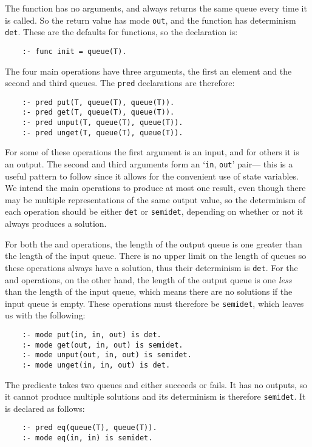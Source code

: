 The  function has no arguments,
and always returns the same queue every time it is called.
So the return value has mode \texttt{out},
and the function has determinism \texttt{det}.
These are the defaults for functions,
so the declaration is:
\begin{verbatim}
    :- func init = queue(T).
\end{verbatim}

The four main operations have three arguments,
the first an element and the second and third queues.
The \texttt{pred} declarations are therefore:
\begin{verbatim}
    :- pred put(T, queue(T), queue(T)).
    :- pred get(T, queue(T), queue(T)).
    :- pred unput(T, queue(T), queue(T)).
    :- pred unget(T, queue(T), queue(T)).
\end{verbatim}
For some of these operations the first argument is an input,
and for others it is an output.
The second and third arguments
form an `\texttt{in}, \texttt{out}' pair---%
this is a useful pattern to follow
since it allows for the convenient use of state variables.
We intend the main operations to produce at most one result,
even though there may be
multiple representations of the same output value,
so the determinism of each operation
should be either \texttt{det} or \texttt{semidet},
depending on whether or not it always produces a solution.

For both the  and  operations,
the length of the output queue is one greater than
the length of the input queue.
There is no upper limit on the length of queues
so these operations always have a solution,
thus their determinism is \texttt{det}.
For the  and  operations,
on the other hand,
the length of the output queue is one \emph{less} than
the length of the input queue,
which means there are no solutions if the input queue is empty.
These operations must therefore be \texttt{semidet},
which leaves us with the following:
\begin{verbatim}
    :- mode put(in, in, out) is det.
    :- mode get(out, in, out) is semidet.
    :- mode unput(out, in, out) is semidet.
    :- mode unget(in, in, out) is det.
\end{verbatim}

The  predicate takes two queues and either succeeds or fails.
It has no outputs,
so it cannot produce multiple solutions
and its determinism is therefore \texttt{semidet}.
It is declared as follows:
\begin{verbatim}
    :- pred eq(queue(T), queue(T)).
    :- mode eq(in, in) is semidet.
\end{verbatim}

